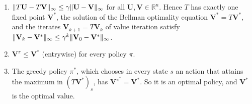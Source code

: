 \begin{theorem}\label{L4-thm:value-iteration}
    \begin{enumerate}
        \item $\lVert T\mathbf{U} - T\mathbf{V} \rVert_\infty \leq \gamma\lVert \mathbf{U} - \mathbf{V} \rVert_\infty$ for all $\mathbf{U}, \mathbf{V} \in \mathbb{R}^n$. Hence $T$ has exactly one fixed point $\mathbf{V}^*$, the solution of the Bellman optimality equation $\mathbf{V}^* = T\mathbf{V}^*$, and the iterates $\mathbf{V}_{k+1} = T\mathbf{V}_k$ of value iteration satisfy $\lVert \mathbf{V}_k - \mathbf{V}^* \rVert_\infty \leq \gamma^k\lVert \mathbf{V}_0 - \mathbf{V}^* \rVert_\infty$.
        \item $\mathbf{V}^\pi \leq \mathbf{V}^*$ (entrywise) for every policy $\pi$.
        \item The greedy policy $\pi^*$, which chooses in every state $s$ an action that attains the maximum in $(T\mathbf{V}^*)_s$, has $\mathbf{V}^{\pi^*} = \mathbf{V}^*$. So it is an optimal policy, and $\mathbf{V}^*$ is the optimal value.
    \end{enumerate}
\end{theorem}

